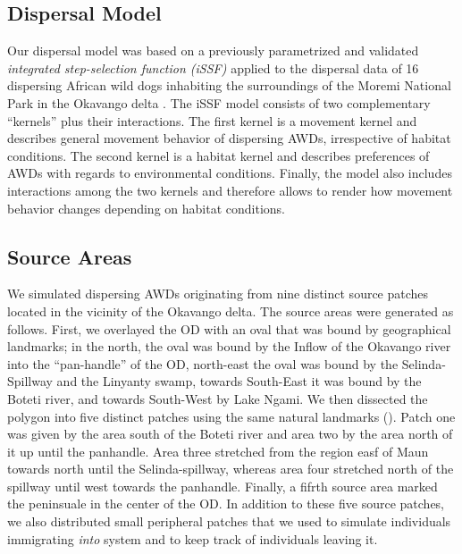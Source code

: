 \documentclass[abstract=on,10pt,a4paper,bibliography=totocnumbered]{article}
\begin{document}
\subsection{Dispersal Model}
Our dispersal model was based on a previously parametrized and validated
\textit{integrated step-selection function (iSSF)} applied to the dispersal data
of 16 dispersing African wild dogs inhabiting the surroundings of the Moremi
National Park in the Okavango delta \citep{Hofmann.2021}. The iSSF model
consists of two complementary ``kernels'' plus their interactions. The first
kernel is a movement kernel and describes general movement behavior of
dispersing AWDs, irrespective of habitat conditions. The second kernel is a
habitat kernel and describes preferences of AWDs with regards to environmental
conditions. Finally, the model also includes interactions among the two kernels
and therefore allows to render how movement behavior changes depending on
habitat conditions.

\subsection{Source Areas}
We simulated dispersing AWDs originating from nine distinct source patches
located in the vicinity of the Okavango delta. The source areas were generated
as follows. First, we overlayed the OD with an oval that was bound by
geographical landmarks; in the north, the oval was bound by the Inflow of the
Okavango river into the ``pan-handle'' of the OD, north-east the oval was bound
by the Selinda-Spillway and the Linyanty swamp, towards South-East it was bound
by the Boteti river, and towards South-West by Lake Ngami. We then dissected the
polygon into five distinct patches using the same natural landmarks
(). Patch one was given by the area south of the Boteti river
and area two by the area north of it up until the panhandle. Area three
stretched from the region easf of Maun towards north until the Selinda-spillway,
whereas area four stretched north of the spillway until west towards the
panhandle. Finally, a fifrth source area marked the peninsuale in the center of
the OD. In addition to these five source patches, we also distributed small
peripheral patches that we used to simulate individuals immigrating
\textit{into} system and to keep track of individuals leaving it.
\end{document}
